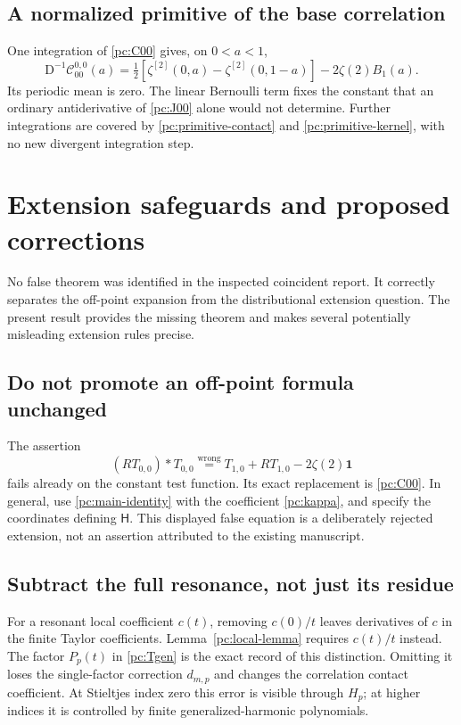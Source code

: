 \documentclass[11pt,a4paper]{article}
\numberwithin{equation}{section}
\theoremstyle{definition}
\newcommand{\D}{\mathrm D}
\newcommand{\HH}{\mathsf H}
\newcommand{\CC}{\mathcal C}
\newcommand{\one}{\mathbf 1}
\begin{document}
\subsection{A normalized primitive of the base correlation}
One integration of \eqref{pc:C00} gives, on $0<a<1$,
\begin{equation}\label{pc:first-primitive}
\D^{-1}\CC_{00}^{0,0}(a)
=\tfrac12\left[\zeta^{[2]}(0,a)-\zeta^{[2]}(0,1-a)\right]
-2\zeta(2)B_1(a).
\end{equation}
Its periodic mean is zero. The linear Bernoulli term fixes the constant that an ordinary antiderivative of \eqref{pc:J00} alone would not determine. Further integrations are covered by \eqref{pc:primitive-contact} and \eqref{pc:primitive-kernel}, with no new divergent integration step.

\section{Extension safeguards and proposed corrections}\label{pc:safeguards}
No false theorem was identified in the inspected coincident report. It correctly separates the off-point expansion from the distributional extension question. The present result provides the missing theorem and makes several potentially misleading extension rules precise.

\subsection{Do not promote an off-point formula unchanged}
The assertion
\[
(RT_{0,0})*T_{0,0}\stackrel{\mathrm{wrong}}=T_{1,0}+RT_{1,0}-2\zeta(2)\one
\]
fails already on the constant test function. Its exact replacement is \eqref{pc:C00}. In general, use \eqref{pc:main-identity} with the coefficient \eqref{pc:kappa}, and specify the coordinates defining $\HH$. This displayed false equation is a deliberately rejected extension, not an assertion attributed to the existing manuscript.

\subsection{Subtract the full resonance, not just its residue}
For a resonant local coefficient $c(t)$, removing $c(0)/t$ leaves derivatives of $c$ in the finite Taylor coefficients. Lemma~\ref{pc:local-lemma} requires $c(t)/t$ instead. The factor $P_p(t)$ in \eqref{pc:Tgen} is the exact record of this distinction. Omitting it loses the single-factor correction $d_{m,p}$ and changes the correlation contact coefficient. At Stieltjes index zero this error is visible through $H_p$; at higher indices it is controlled by finite generalized-harmonic polynomials.
\end{document}
